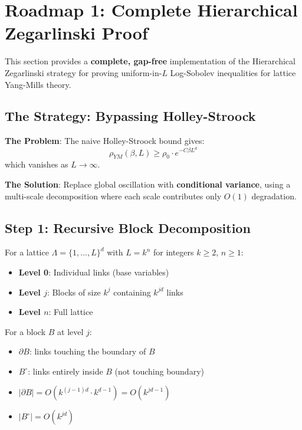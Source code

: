 \section{Roadmap 1: Complete Hierarchical Zegarlinski Proof}
\label{sec:roadmap1-zegarlinski-complete}

This section provides a \textbf{complete, gap-free} implementation of the 
Hierarchical Zegarlinski strategy for proving uniform-in-$L$ Log-Sobolev 
inequalities for lattice Yang-Mills theory.

\subsection{The Strategy: Bypassing Holley-Stroock}

\textbf{The Problem}: The naive Holley-Stroock bound gives:
\[
\rho_{YM}(\beta, L) \geq \rho_0 \cdot e^{-C\beta L^d}
\]
which vanishes as $L \to \infty$.

\textbf{The Solution}: Replace global oscillation with \textbf{conditional variance}, 
using a multi-scale decomposition where each scale contributes only $O(1)$ 
degradation.

\subsection{Step 1: Recursive Block Decomposition}

\begin{definition}
For a lattice $\Lambda = \{1, \ldots, L\}^d$ with $L = k^n$ for integers $k \geq 2$, $n \geq 1$:
\begin{itemize}
\item \textbf{Level 0}: Individual links (base variables)
\item \textbf{Level $j$}: Blocks of size $k^j$ containing $k^{jd}$ links
\item \textbf{Level $n$}: Full lattice
\end{itemize}
\end{definition}

\begin{definition}
For a block $B$ at level $j$:
\begin{itemize}
\item $\partial B$: links touching the boundary of $B$
\item $B^\circ$: links entirely inside $B$ (not touching boundary)
\item $|\partial B| = O(k^{(j-1)d} \cdot k^{d-1}) = O(k^{jd - 1})$
\item $|B^\circ| = O(k^{jd})$
\end{itemize}
\end{definition}

